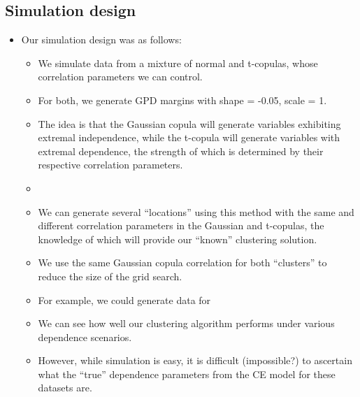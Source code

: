 \documentclass{article}
\numberwithin{equation}{section}
\begin{document}
\subsection{Simulation design} \label{subsec:sim_design}


\begin{itemize}
  \item Our simulation design was as follows:
  \begin{itemize}
    \item We simulate data from a mixture of normal and t-copulas, whose correlation parameters we can control.
    \item For both, we generate GPD margins with shape = -0.05, scale = 1. 
    \item The idea is that the Gaussian copula will generate variables exhibiting extremal independence, while the t-copula will generate variables with extremal dependence, the strength of which is determined by their respective correlation parameters.
    \item 
    \item We can generate several ``locations'' using this method with the same and different correlation parameters in the Gaussian and t-copulas, the knowledge of which will provide our ``known'' clustering solution. 
    \item We use the same Gaussian copula correlation for both ``clusters'' to reduce the size of the grid search.
    \item For example, we could generate data for 
    \item We can see how well our clustering algorithm performs under various dependence scenarios.
    \item However, while simulation is easy, it is difficult (impossible?) to ascertain what the ``true'' dependence parameters from the CE model for these datasets are.

\end{itemize}


\end{itemize}
\end{document}
